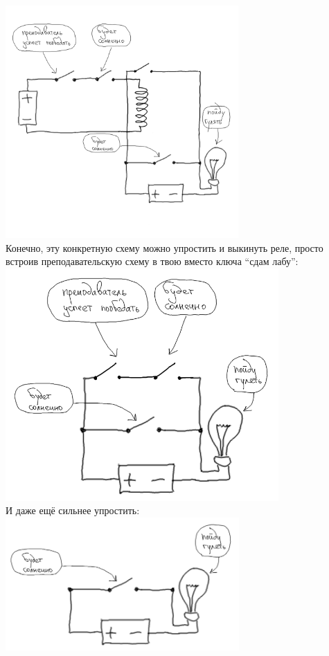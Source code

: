 \documentclass[11pt]{book}
\begin{document}
\includegraphics[height=3.5in]{pic/12.png}
\\
Конечно, эту конкретную схему можно упростить и выкинуть реле, просто встроив преподавательскую схему
в твою вместо ключа ``сдам лабу'':
\\
\includegraphics[height=3.5in]{pic/13.png}
\\
И даже ещё сильнее упростить:
\\
\includegraphics[height=2in]{pic/14.png}
\end{document}

